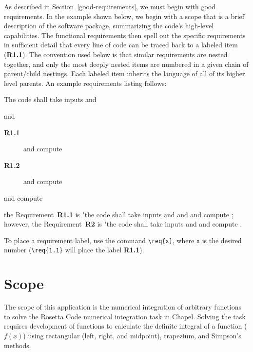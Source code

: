 \label{Requirements}

\begin{seamlessnote}
  As described in Section~\ref{good-requirements}, we must begin with good requirements. In the example shown below,
  we begin with a scope that is a brief description of the software package, summarizing the code's high-level
  capabilities. The functional requirements then spell out the specific requirements in sufficient detail that 
  every line of code can be traced back to a labeled item (\eg \textbf{R1.1}). The convention used below is that
  similar requirements are nested together, and only the most deeply nested items are numbered in a given
  chain of parent/child nestings. Each labeled item inherits the language of all of its higher level parents.
  An example requirements listing follows:
  \begin{description}
    \item The code shall take inputs  and 
      \begin{description} 
        \item and 
          \begin{description}
            \item[\textbf{R1.1}] and compute 
            \item[\textbf{R1.2}] and compute 
          \end{description}
        \item[\textbf{R2}] and compute 
      \end{description}
  \end{description}
  the Requirement~\textbf{R1.1} is "the code shall take inputs  and  and 
  and compute ; however, the Requirement~\textbf{R2} is "the code shall take 
  inputs  and  and compute .

  To place a requirement label, use the command \verb|\req{x}|, where \verb|x| is the desired 
  number (\eg \verb|\req{1.1}| will place the label \textbf{R1.1}).
\end{seamlessnote}

\section{Scope}
\label{Scope}

The scope of this application is the numerical integration of arbitrary functions 
to solve the Rosetta Code numerical integration task\cite{rosetta-code-numerical-integration}
in Chapel. Solving the task requires development of functions to calculate the definite 
integral of a function ($f(x)$) using rectangular (left, right, and midpoint), trapezium, and Simpson's methods.

